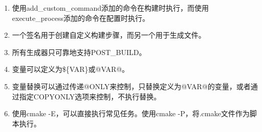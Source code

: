 

\begin{enumerate}
\item 
使用add\_custom\_command添加的命令在构建时执行，而使用execute\_process添加的命令在配置时执行。

\item
一个签名用于创建自定义构建步骤，而另一个用于生成文件。

\item 
所有生成器只可靠地支持POST\_BUILD。

\item 
变量可以定义为\$\{VAR\}或@VAR@。

\item 
变量替换可以通过传递@ONLY来控制，只替换定义为@VAR@的变量，或者通过指定COPYONLY选项来控制，不执行替换。

\item 
使用cmake -E，可以直接执行常见任务。使用cmake -P，将.cmake文件作为脚本执行。
\end{enumerate}